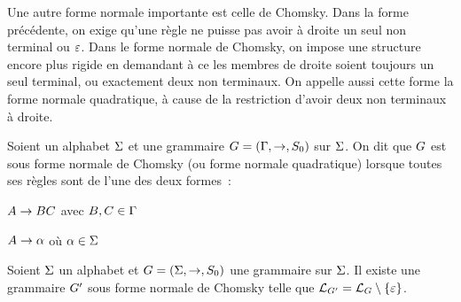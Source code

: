 Une autre forme normale importante est celle de Chomsky. Dans la forme
précédente, on exige qu'une règle ne puisse pas avoir à droite un seul non
terminal ou $\varepsilon$. Dans le forme normale de Chomsky, on impose une structure
encore plus rigide en demandant à ce les membres de droite soient toujours
un seul terminal, ou exactement deux non terminaux. On appelle aussi cette forme
la forme normale quadratique, à cause de la restriction d'avoir deux non
terminaux à droite.

\begin{definition}
  Soient un alphabet $\Sigma$ et une grammaire $G=(\Gamma,\to,S_{0})$ sur
  $\Sigma$.
  On dit que $G$ est sous forme normale de Chomsky (ou forme normale
  quadratique) lorsque toutes ses règles sont de l'une des deux formes~:
  \begin{itemize}
    \begin{minipage}{0.45\textwidth}
    \item $A \to BC$ avec $B,C\in \Gamma$
    \end{minipage}
    \begin{minipage}{0.45\textwidth}
    \item $A \to \alpha$ où $\alpha \in \Sigma$
    \end{minipage}
  \end{itemize}
\end{definition}

\begin{proposition}\label{prop.chom}
  Soient $\Sigma$ un alphabet et $G = (\Sigma,\to,S_{0})$ une grammaire sur
  $\Sigma$.
  Il existe une grammaire $G'$ sous forme normale de Chomsky telle que
  $\mathcal L_{G'} = \mathcal L_{G}\setminus \{\varepsilon\}$.
\end{proposition}

